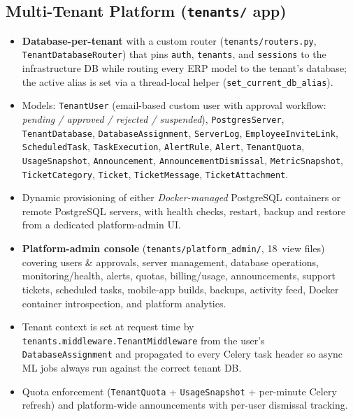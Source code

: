 \documentclass[12pt,a4paper]{report}
\begin{document}
\subsection{Multi-Tenant Platform (\texttt{tenants/} app)}
\begin{itemize}
  \item \textbf{Database-per-tenant} with a custom router (\texttt{tenants/routers.py}, \texttt{TenantDatabaseRouter}) that pins \texttt{auth}, \texttt{tenants}, and \texttt{sessions} to the infrastructure DB while routing every ERP model to the tenant's database; the active alias is set via a thread-local helper (\texttt{set\_current\_db\_alias}).
  \item Models: \texttt{TenantUser} (email-based custom user with approval workflow: \emph{pending / approved / rejected / suspended}), \texttt{PostgresServer}, \texttt{TenantDatabase}, \texttt{DatabaseAssignment}, \texttt{ServerLog}, \texttt{EmployeeInviteLink}, \texttt{ScheduledTask}, \texttt{TaskExecution}, \texttt{AlertRule}, \texttt{Alert}, \texttt{TenantQuota}, \texttt{UsageSnapshot}, \texttt{Announcement}, \texttt{AnnouncementDismissal}, \texttt{MetricSnapshot}, \texttt{TicketCategory}, \texttt{Ticket}, \texttt{TicketMessage}, \texttt{TicketAttachment}.
  \item Dynamic provisioning of either \emph{Docker-managed} PostgreSQL containers or remote PostgreSQL servers, with health checks, restart, backup and restore from a dedicated platform-admin UI.
  \item \textbf{Platform-admin console} (\texttt{tenants/platform\_admin/}, 18~view files) covering users \& approvals, server management, database operations, monitoring/health, alerts, quotas, billing/usage, announcements, support tickets, scheduled tasks, mobile-app builds, backups, activity feed, Docker container introspection, and platform analytics.
  \item Tenant context is set at request time by \texttt{tenants.middleware.TenantMiddleware} from the user's \texttt{DatabaseAssignment} and propagated to every Celery task header so async ML jobs always run against the correct tenant DB.
  \item Quota enforcement (\texttt{TenantQuota} + \texttt{UsageSnapshot} + per-minute Celery refresh) and platform-wide announcements with per-user dismissal tracking.
\end{itemize}
\end{document}
